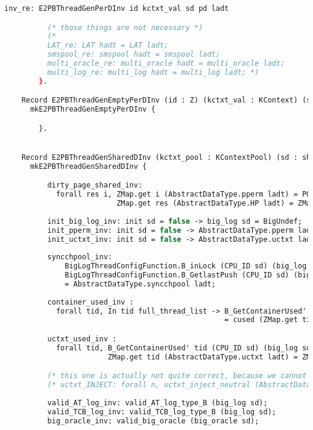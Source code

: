 \begin{lstlisting}[language=Caml]
          inv_re: E2PBThreadGenPerDInv id kctxt_val sd pd ladt

          (* those things are not necessary *)
          (*
          LAT_re: LAT hadt = LAT ladt; 
          smspool_re: smspool hadt = smspool ladt;
          multi_oracle_re: multi_oracle hadt = multi_oracle ladt;
          multi_log_re: multi_log hadt = multi_log ladt; *)
        }.

    Record E2PBThreadGenEmptyPerDInv (id : Z) (kctxt_val : KContext) (sd : sharedData) (ladt : AbstractDataType.RData) :=
      mkE2PBThreadGenEmptyPerDInv {

        }.


    Record E2PBThreadGenSharedDInv (kctxt_pool : KContextPool) (sd : sharedData) (ladt : AbstractDataType.RData) :=
      mkE2PBThreadGenSharedDInv {

          dirty_page_shared_inv:
            forall res i, ZMap.get i (AbstractDataType.pperm ladt) = PGUndef ->
                          ZMap.get res (AbstractDataType.HP ladt) = ZMap.get res (FlatMem.free_page i (AbstractDataType.HP ladt));
          
          init_big_log_inv: init sd = false -> big_log sd = BigUndef;
          init_pperm_inv: init sd = false -> AbstractDataType.pperm ladt = ZMap.init PGUndef;
          init_uctxt_inv: init sd = false -> AbstractDataType.uctxt ladt = ZMap.init (ZMap.init Vundef);
         
          syncchpool_inv:  
              BigLogThreadConfigFunction.B_inLock (CPU_ID sd) (big_log sd) = false ->
              BigLogThreadConfigFunction.B_GetlastPush (CPU_ID sd) (big_log sd) 
              = AbstractDataType.syncchpool ladt;
          
          container_used_inv :
            forall tid, In tid full_thread_list -> B_GetContainerUsed' tid (CPU_ID sd) (big_log sd) 
                                                   = cused (ZMap.get tid (AbstractDataType.AC ladt));

          uctxt_used_inv :
            forall tid, B_GetContainerUsed' tid (CPU_ID sd) (big_log sd) = false ->
                        ZMap.get tid (AbstractDataType.uctxt ladt) = ZMap.init Vundef;

          (* this one is actually not quite correct, because we cannot give the proper n in every cases???? *)
          (* uctxt_INJECT: forall n, uctxt_inject_neutral (AbstractDataType.uctxt ladt) n; *)
          
          valid_AT_log_inv: valid_AT_log_type_B (big_log sd); 
          valid_TCB_log_inv: valid_TCB_log_type_B (big_log sd);
          big_oracle_inv: valid_big_oracle (big_oracle sd);


\end{lstlisting}
